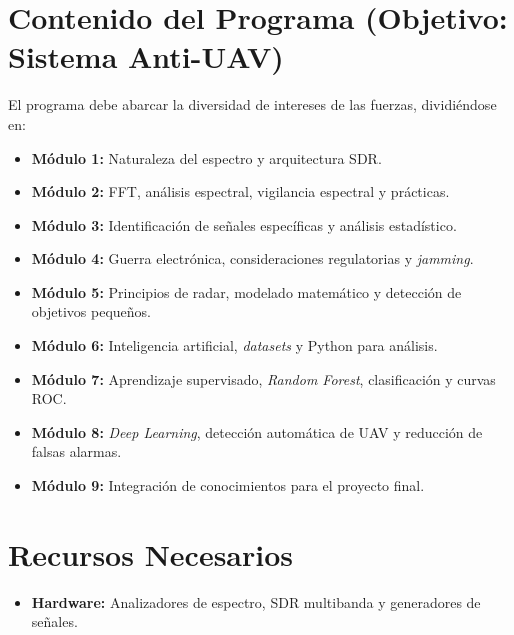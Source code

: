 \documentclass[11pt,a4paper]{article}
\begin{document}
\section{Contenido del Programa (Objetivo: Sistema Anti-UAV)}
El programa debe abarcar la diversidad de intereses de las fuerzas, dividiéndose en:
\begin{itemize}[noitemsep]
    \item \textbf{Módulo 1:} Naturaleza del espectro y arquitectura SDR.
    \item \textbf{Módulo 2:} FFT, análisis espectral, vigilancia espectral y prácticas.
    \item \textbf{Módulo 3:} Identificación de señales específicas y análisis estadístico.
    \item \textbf{Módulo 4:} Guerra electrónica, consideraciones regulatorias y \textit{jamming}.
    \item \textbf{Módulo 5:} Principios de radar, modelado matemático y detección de objetivos pequeños.
    \item \textbf{Módulo 6:} Inteligencia artificial, \textit{datasets} y Python para análisis.
    \item \textbf{Módulo 7:} Aprendizaje supervisado, \textit{Random Forest}, clasificación y curvas ROC.
    \item \textbf{Módulo 8:} \textit{Deep Learning}, detección automática de UAV y reducción de falsas alarmas.
    \item \textbf{Módulo 9:} Integración de conocimientos para el proyecto final.
\end{itemize}

\section{Recursos Necesarios}
\begin{itemize}[noitemsep]
    \item \textbf{Hardware:} Analizadores de espectro, SDR multibanda y generadores de señales.
\end{itemize}
\end{document}
